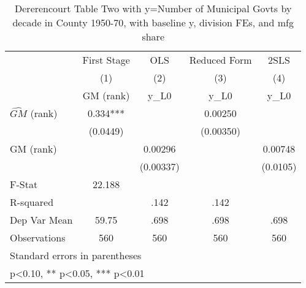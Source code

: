 \begin{table}[htbp]\centering
\def\sym#1{\ifmmode^{#1}\else\(^{#1}\)\fi}
\caption{Dererencourt Table Two with y=Number of Municipal Govts by decade in County 1950-70, with baseline y, division FEs, and mfg share}
\begin{tabular}{l*{4}{c}}
\toprule
                    & First Stage   &         OLS   &Reduced Form   &        2SLS   \\
                    &\multicolumn{1}{c}{(1)}&\multicolumn{1}{c}{(2)}&\multicolumn{1}{c}{(3)}&\multicolumn{1}{c}{(4)}\\
                    &\multicolumn{1}{c}{GM  (rank)}&\multicolumn{1}{c}{y\_L0}&\multicolumn{1}{c}{y\_L0}&\multicolumn{1}{c}{y\_L0}\\
\midrule
$\hat{GM}$ (rank)   &       0.334***&               &     0.00250   &               \\
                    &    (0.0449)   &               &   (0.00350)   &               \\
\addlinespace
GM  (rank)          &               &     0.00296   &               &     0.00748   \\
                    &               &   (0.00337)   &               &    (0.0105)   \\
\midrule
F-Stat              &      22.188   &               &               &               \\
R-squared           &               &        .142   &        .142   &               \\
Dep Var Mean        &       59.75   &        .698   &        .698   &        .698   \\
Observations        &         560   &         560   &         560   &         560   \\
\bottomrule
\multicolumn{5}{l}{\footnotesize Standard errors in parentheses}\\
\multicolumn{5}{l}{\footnotesize * p<0.10, ** p<0.05, *** p<0.01}\\
\end{tabular}
\end{table}

